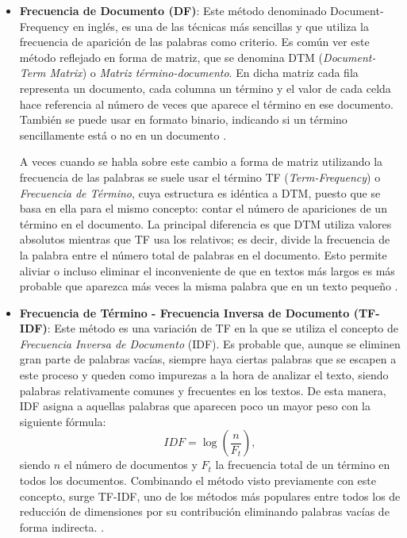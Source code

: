\documentclass[10pt, a4paper]{article}
\begin{document}
\begin{itemize}
  \item \textbf{Frecuencia de Documento (DF)}: Este método denominado Document-Frequency en inglés, es una de las técnicas más sencillas y que utiliza la frecuencia de aparición de las palabras como criterio. Es común ver este método reflejado en forma de matriz, que se denomina  DTM (\textit{Document-Term Matrix}) o \textit{Matriz término-documento}. En dicha matriz cada fila representa un documento, cada columna un término y el valor de cada celda hace referencia al número de veces que aparece el término en ese documento. También se puede usar en formato binario, indicando si un término sencillamente está o no en un documento \cite{survey, Document Representation and Dimension Reduction for Text Clustering, An Evaluation on Feature Selection for Text Clustering, Comparing and Combining Dimension Reduction Techniques for Efficient Text}.
  
  A veces cuando se habla sobre este cambio a forma de matriz utilizando la frecuencia de las palabras se suele usar el término TF (\textit{Term-Frequency}) o \textit{Frecuencia de Término}, cuya estructura es idéntica a DTM, puesto que se basa en ella para el mismo concepto: contar el número de apariciones de un término en el documento. La principal diferencia es que DTM utiliza valores absolutos mientras que TF usa los relativos; es decir, divide la frecuencia de la palabra entre el número total de palabras en el documento. Esto permite aliviar o incluso eliminar el inconveniente de que en textos más largos es más probable que aparezca más veces la misma palabra que en un texto pequeño \cite{text mining use of tf idf to examine the relevance of words to documents}.
  
  \item \textbf{Frecuencia de Término - Frecuencia Inversa de Documento (TF-IDF)}: Este método es una variación de TF en la que se utiliza el concepto de \textit{Frecuencia Inversa de Documento} (IDF). Es probable que, aunque se eliminen gran parte de palabras vacías, siempre haya ciertas palabras que se escapen a este proceso y queden como impurezas a la hora de analizar el texto, siendo palabras relativamente comunes y frecuentes en los textos. De esta manera, IDF asigna a aquellas palabras que aparecen poco un mayor peso con la siguiente fórmula: \begin{equation} IDF = \log \left( \frac{n}{F_t} \right), \end{equation} siendo $n$ el número de documentos y $F_t$ la frecuencia total de un término en todos los documentos. Combinando el método visto previamente con este concepto, surge TF-IDF, uno de los métodos más populares entre todos los de reducción de dimensiones por su contribución eliminando palabras vacías de forma indirecta. \cite{text mining use of tf idf to examine the relevance of words to documents, A comparative study of tf idf lsi and multi words for text classification, Document clustering tfidf approach}.
  

\end{itemize}
\end{document}
